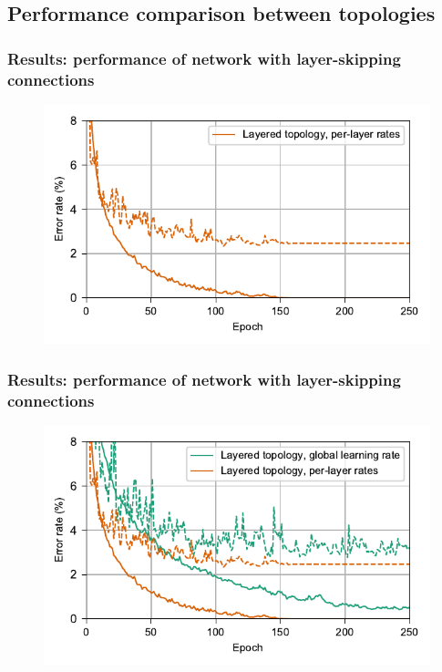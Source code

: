 \documentclass[pdf]{beamer}
\begin{document}
\subsection{Performance comparison between topologies}
\begin{frame}
	\frametitle{Results: performance of network with layer-skipping connections}
	\begin{figure}
		\includegraphics[width=\textwidth]{figures/performance_original.pdf}
	\end{figure}
\end{frame}
\begin{frame}
	\frametitle{Results: performance of network with layer-skipping connections}
	\begin{figure}
		\includegraphics[width=\textwidth]{figures/performance_original+global.pdf}
	\end{figure}
\end{frame}
\end{document}
